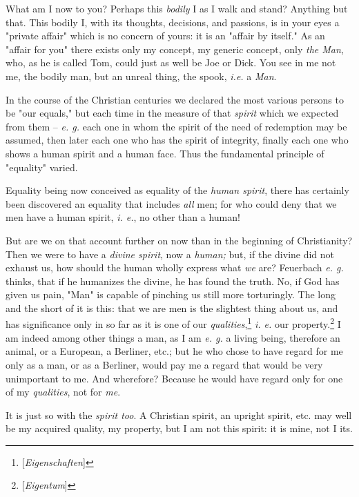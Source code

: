 What am I now to you? Perhaps this \textit{bodily} I as I walk and stand? 
Anything but that. This bodily I, with its thoughts, decisions, and passions, 
is in your eyes a "{}private affair"{} which is no concern of yours: it is an 
"{}affair by itself."{} As an "{}affair for you"{} there exists only my 
concept, my generic concept, only \textit{the Man}, who, as he is called Tom, 
could just as well be Joe or Dick. You see in me not me, the bodily man, but 
an unreal thing, the spook, \textit{i.e.} a \textit{Man}.

In the course of the Christian centuries we declared the most various persons 
to be "{}our equals,"{} but each time in the measure of that \textit{spirit} 
which we expected from them -- \textit{e. g.} each one in whom the spirit of 
the need of redemption may be assumed, then later each one who has the spirit 
of integrity, finally each one who shows a human spirit and a human face. Thus 
the fundamental principle of "{}equality"{} varied.

 Equality being now conceived as equality of the \textit{human spirit}, there 
has certainly been discovered an equality that includes \textit{all} men; for 
who could deny that we men have a human spirit, \textit{i. e.}, no other than 
a human!

But are we on that account further on now than in the beginning of 
Christianity? Then we were to have a \textit{divine spirit}, now a 
\textit{human;} but, if the divine did not exhaust us, how should the human 
wholly express what \textit{we} are? Feuerbach \textit{e. g.} thinks, that if 
he humanizes the divine, he has found the truth. No, if God has given us pain, 
"{}Man"{} is capable of pinching us still more torturingly. The long and the 
short of it is this: that we are men is the slightest thing about us, and has 
significance only in so far as it is one of our 
\textit{qualities},\footnote{[\textit{Eigenschaften}]} \textit{i. e.} our 
property.\footnote{[\textit{Eigentum}]} I am indeed among other things a man, 
as I am \textit{e. g.} a living being, therefore an animal, or a European, a 
Berliner, etc.; but he who chose to have regard for me only as a man, or as a 
Berliner, would pay me a regard that would be very unimportant to me. And 
wherefore? Because he would have regard only for one of my \textit{qualities}, 
not for \textit{me}.

It is just so with the \textit{spirit too}. A Christian spirit, an upright 
spirit, etc. may well be my acquired quality, my property, but I am not this 
spirit: it is mine, not I its.

